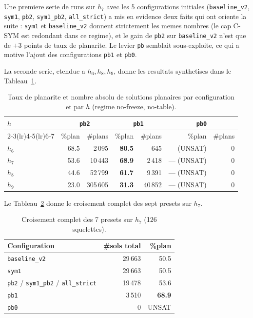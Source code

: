 \documentclass[11pt,a4paper]{article}
\begin{document}
Une premiere serie de runs sur $h_7$ avec les 5 configurations
initiales (\texttt{baseline\_v2}, \texttt{sym1}, \texttt{pb2},
\texttt{sym1\_pb2}, \texttt{all\_strict}) a mis en evidence deux faits
qui ont oriente la suite : \texttt{sym1} et \texttt{baseline\_v2}
donnent strictement les memes nombres (le cap C-SYM est redondant dans
ce regime), et le gain de \texttt{pb2} sur \texttt{baseline\_v2} n'est
que de $+3$ points de taux de planarite. Le levier \texttt{pb}
semblait sous-exploite, ce qui a motive l'ajout des configurations
\texttt{pb1} et \texttt{pb0}.

La seconde serie, etendue a $h_6, h_8, h_9$, donne les resultats
synthetises dans le Tableau~\ref{tab:cross-h}.

\begin{table}[h]
\centering
\small
\begin{tabular}{lrrrrrr}
\toprule
$h$ & \multicolumn{2}{c}{\texttt{pb2}} & \multicolumn{2}{c}{\texttt{pb1}} & \multicolumn{2}{c}{\texttt{pb0}} \\
\cmidrule(lr){2-3}\cmidrule(lr){4-5}\cmidrule(lr){6-7}
    & \%plan & \#plans & \%plan & \#plans & \%plan & \#plans \\
\midrule
$h_6$ & 68.5 & 2\,095   & \textbf{80.5} & 645    & --- (UNSAT) & 0 \\
$h_7$ & 53.6 & 10\,443  & \textbf{68.9} & 2\,418 & --- (UNSAT) & 0 \\
$h_8$ & 44.6 & 52\,799  & \textbf{61.7} & 9\,391 & --- (UNSAT) & 0 \\
$h_9$ & 23.0 & 305\,605 & \textbf{31.3} & 40\,852 & --- (UNSAT) & 0 \\
\bottomrule
\end{tabular}
\caption{Taux de planarite et nombre absolu de solutions planaires par
configuration et par $h$ (regime no-freeze, no-table).}
\label{tab:cross-h}
\end{table}

Le Tableau~\ref{tab:h7} donne le croisement complet des sept presets
sur $h_7$.

\begin{table}[h]
\centering
\small
\begin{tabular}{lrr}
\toprule
Configuration & \#sols total & \%plan \\
\midrule
\texttt{baseline\_v2}                                    & 29\,663 & 50.5 \\
\texttt{sym1}                                            & 29\,663 & 50.5 \\
\texttt{pb2} / \texttt{sym1\_pb2} / \texttt{all\_strict} & 19\,478 & 53.6 \\
\texttt{pb1}                                             & 3\,510  & \textbf{68.9} \\
\texttt{pb0}                                             & 0       & UNSAT \\
\bottomrule
\end{tabular}
\caption{Croisement complet des 7 presets sur $h_7$ (126 squelettes).}
\label{tab:h7}
\end{table}
\end{document}
